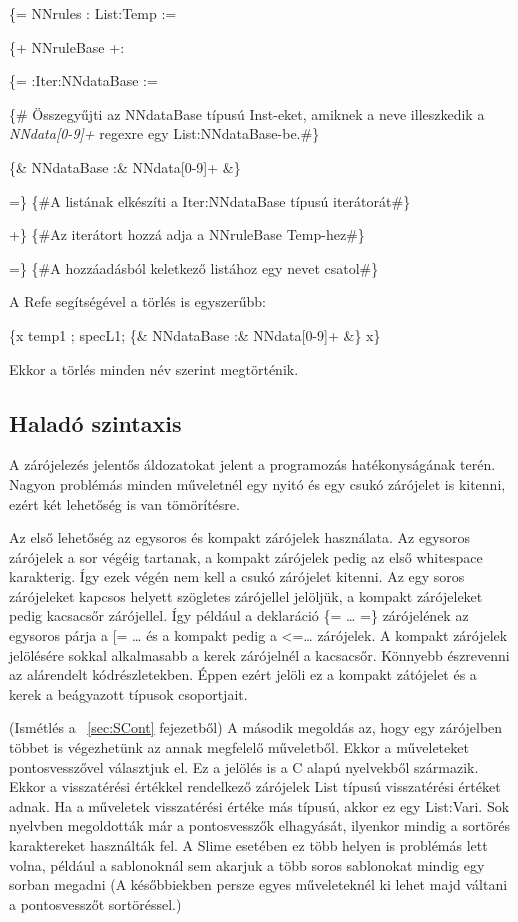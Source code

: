 {\{= NNrules : List:Temp := 

\{+ NNruleBase +: 

\{= :Iter:NNdataBase := 

\{\# Összegyűjti az NNdataBase típusú Inst-eket, amiknek a neve illeszkedik a \textit{NNdata[0-9]+} regexre egy List:NNdataBase-be.\#\}

\{\& NNdataBase :\& NNdata[0-9]+ \&\} 

=\} \{\#A listának elkészíti a Iter:NNdataBase típusú iterátorát\#\}

+\} \{\#Az iterátort hozzá adja a NNruleBase Temp-hez\#\}

=\} \{\#A hozzáadásból keletkező listához egy nevet csatol\#\}

A Refe segítségével a törlés is egyszerűbb:

\{x temp1 ; specL1; \{\& NNdataBase :\& NNdata[0-9]+ \&\} x\}

Ekkor a törlés minden név szerint megtörténik.



\subsection{Haladó szintaxis}
\label{sec:SAdvaSyntax}
A zárójelezés jelentős áldozatokat jelent a programozás hatékonyságának terén. 
Nagyon problémás minden műveletnél egy nyitó és egy csukó zárójelet is kitenni, ezért két lehetőség is van tömörítésre.

Az első lehetőség az egysoros és kompakt zárójelek használata. 
Az egysoros zárójelek a sor végéig tartanak, a kompakt zárójelek pedig az első whitespace karakterig. 
Így ezek végén nem kell a csukó zárójelet kitenni. 
Az egy soros zárójeleket kapcsos helyett szögletes zárójellel jelöljük, a kompakt zárójeleket pedig kacsacsőr zárójellel. 
Így például a deklaráció \{= … =\} zárójelének az egysoros párja a [= … és a kompakt pedig a <=… zárójelek.
A kompakt zárójelek jelölésére sokkal alkalmasabb a kerek zárójelnél a kacsacsőr.
Könnyebb észrevenni az alárendelt kódrészletekben.
Éppen ezért jelöli ez a kompakt zátójelet és a kerek a beágyazott típusok csoportjait.

(Ismétlés a ~\ref{sec:SCont} fejezetből)
A második megoldás az, hogy egy zárójelben többet is végezhetünk az annak megfelelő műveletből. 
Ekkor a műveleteket pontosvesszővel választjuk el.
Ez a jelölés is a C alapú nyelvekből származik.
Ekkor a visszatérési értékkel rendelkező zárójelek List típusú visszatérési értéket adnak.
Ha a műveletek visszatérési értéke más típusú, akkor ez egy List:Vari. 
Sok nyelvben megoldották már a pontosvesszők elhagyását, ilyenkor mindig a sortörés karaktereket használták fel.
A Slime esetében ez több helyen is problémás lett volna, például a sablonoknál sem akarjuk a több soros sablonokat mindig egy sorban megadni
(A későbbiekben persze egyes műveleteknél ki lehet majd váltani a pontosvesszőt sortöréssel.)

}
